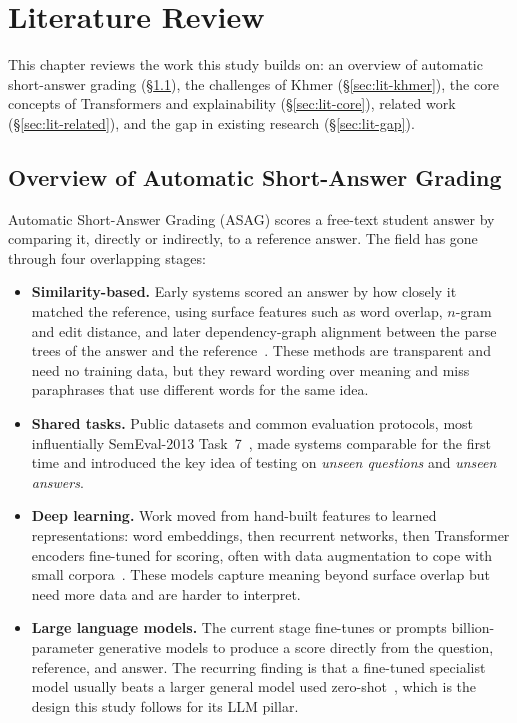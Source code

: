 \chapter{Literature Review}
\label{ch:literature}

This chapter reviews the work this study builds on: an overview of automatic short-answer grading
(\S\ref{sec:lit-asag}), the challenges of Khmer (\S\ref{sec:lit-khmer}), the core concepts of
Transformers and explainability (\S\ref{sec:lit-core}), related work (\S\ref{sec:lit-related}), and
the gap in existing research (\S\ref{sec:lit-gap}).

\section{Overview of Automatic Short-Answer Grading}
\label{sec:lit-asag}
Automatic Short-Answer Grading (ASAG) scores a free-text student answer by comparing it, directly or
indirectly, to a reference answer. The field has gone through four overlapping stages:

\begin{itemize}[leftmargin=1.4em]
  \item \textbf{Similarity-based.} Early systems scored an answer by how closely it matched the
  reference, using surface features such as word overlap, $n$-gram and edit distance, and later
  dependency-graph alignment between the parse trees of the answer and the reference~\citep{mohler2011}.
  These methods are transparent and need no training data, but they reward wording over meaning and miss
  paraphrases that use different words for the same idea.
  \item \textbf{Shared tasks.} Public datasets and common evaluation protocols, most influentially
  SemEval-2013 Task~7~\citep{dzikovska2013}, made systems comparable for the first time and introduced
  the key idea of testing on \emph{unseen questions} and \emph{unseen answers}.
  \item \textbf{Deep learning.} Work moved from hand-built features to learned representations: word
  embeddings, then recurrent networks, then Transformer encoders fine-tuned for scoring, often with data
  augmentation to cope with small corpora~\citep{sung2022survey,tan2025review}. These models capture
  meaning beyond surface overlap but need more data and are harder to interpret.
  \item \textbf{Large language models.} The current stage fine-tunes or prompts billion-parameter
  generative models to produce a score directly from the question, reference, and answer. The recurring
  finding is that a fine-tuned specialist model usually beats a larger general model used
  zero-shot~\citep{chang2024gpt4}, which is the design this study follows for its LLM pillar.
\end{itemize}

